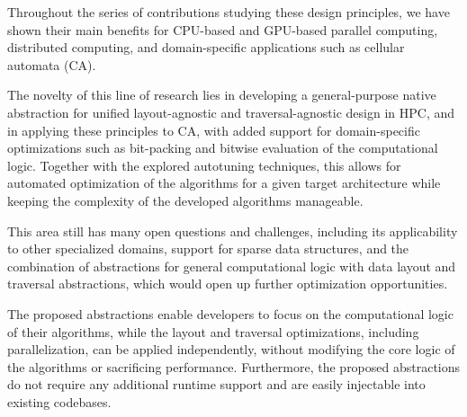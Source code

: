 Throughout the series of contributions studying these design principles, we have shown their main benefits for CPU-based and GPU-based parallel computing, distributed computing, and domain-specific applications such as cellular automata (CA).

The novelty of this line of research lies in developing a general-purpose native abstraction for unified layout-agnostic and traversal-agnostic design in HPC, and in applying these principles to CA, with added support for domain-specific optimizations such as bit-packing and bitwise evaluation of the computational logic. Together with the explored autotuning techniques, this allows for automated optimization of the algorithms for a given target architecture while keeping the complexity of the developed algorithms manageable.

This area still has many open questions and challenges, including its applicability to other specialized domains, support for sparse data structures, and the combination of abstractions for general computational logic with data layout and traversal abstractions, which would open up further optimization opportunities.

The proposed abstractions enable developers to focus on the computational logic of their algorithms, while the layout and traversal optimizations, including parallelization, can be applied independently, without modifying the core logic of the algorithms or sacrificing performance. Furthermore, the proposed abstractions do not require any additional runtime support and are easily injectable into existing codebases.
